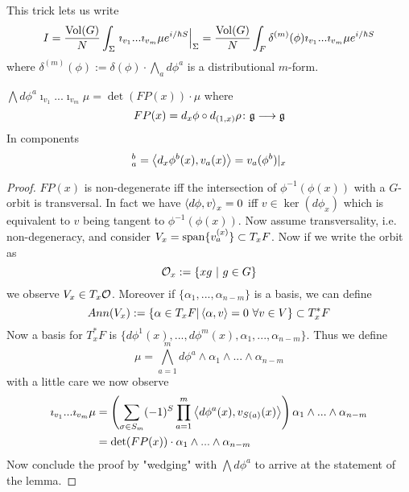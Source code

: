 \begin{sketch}
  This trick lets us write
  \begin{align}
    I = \frac{\vol(G)}{N} \int_\Sigma \left. \imath_{v_1} ... \imath_{v_m} \mu e^{i/\hbar S} \right|_\Sigma = \frac{\vol(G)}{N} \int_F \delta^{(m)}(\phi) \imath_{v_1} ... \imath_{v_m} \mu e^{i/\hbar S}
  \end{align}
  where $\delta^{(m)}(\phi) := \delta(\phi) \cdot \bigwedge_a d\phi^a$ is a distributional $m$-form.
\end{sketch}

\begin{lem}
  $\bigwedge d\phi^a \imath_{v_1} ... \imath_{v_m} \mu = \det(FP(x)) \cdot \mu$ where
  \begin{equation}
    FP(x) = d_x \phi \circ d_{(1,x)} \rho \colon \gf \lra \gf
  \end{equation}
  In components
  \begin{equation}
    [FP(x)]^b_a = \pair{d_x\phi^b(x)}{v_a(x)} = v_a (\phi^b)|_x
  \end{equation}
\begin{proof}
  $FP(x)$ is non-degenerate iff the intersection of $\phi^{-1}(\phi(x))$ with a $G$-orbit is transversal. In fact we have $\pair{d\phi}{v}_x = 0$ iff $v \in \ker(d\phi_x)$ which is equivalent to $v$ being tangent to $\phi^{-1}(\phi(x))$. Now assume transversality, i.e. non-degeneracy, and consider $V_x = \operatorname{span}\{v_a^{(x)}\} \subset T_x F$. Now if we write the orbit as
  \begin{equation}
    \mathcal{O}_x := \{xg \ | \ g \in G \}
  \end{equation}
  we observe $V_x \in T_x \mathcal{O}$. Moreover if $\{\alpha_1, ..., \alpha_{n-m}\}$ is a basis, we can define
  \begin{equation}
    Ann(V_x) := \{ \alpha \in T_x F | \left\langle \alpha , v \right\rangle = 0 \ \forall v \in V \} \subset T^*_x F
  \end{equation}
  Now a basis for $T^*_x F$ is $\{d\phi^1(x), ..., d\phi^m(x), \alpha_1, ..., \alpha_{n-m} \}$. Thus we define
  \begin{equation}
    \mu = \bigwedge_{a=1}^m d\phi^a  \wedge \alpha_1 \wedge ... \wedge \alpha_{n-m}
  \end{equation}
  with a little care we now observe
  \begin{align}
    \imath_{v_1} ... \imath_{v_m} \mu &= \left( \sum_{\sigma \in S_m} (-1)^S \prod_{a = 1}^m \pair{d\phi^a(x)}{v_{S(a)}(x)} \right) \alpha_1 \wedge ... \wedge \alpha_{n-m}\\
    &= \det(FP(x)) \cdot \alpha_1 \wedge ... \wedge \alpha_{n-m}
  \end{align}
  Now conclude the proof by "wedging" with $\bigwedge d\phi^a$ to arrive at the statement of the lemma.
\end{proof}
\end{lem}


